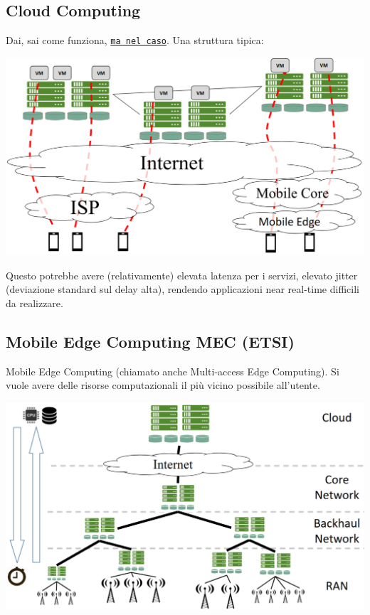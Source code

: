 \subsection*{Cloud Computing}

Dai, sai come funziona, \href{https://it.wikipedia.org/wiki/Cloud_computing}{\texttt{ma nel caso}}. Una struttura tipica:
\begin{center}
	\includegraphics[width=0.8\linewidth]{img/5g/clud}
\end{center}

Questo potrebbe avere (relativamente) elevata latenza per i servizi, elevato jitter (deviazione standard sul delay alta), rendendo applicazioni near real-time difficili da realizzare.

\subsection{Mobile Edge Computing MEC (ETSI)}

Mobile Edge Computing (chiamato anche Multi-access Edge Computing). Si vuole avere delle risorse computazionali il più vicino possibile all'utente. 
\begin{center}
	\includegraphics[width=0.9\linewidth]{img/5g/mec}
\end{center}

